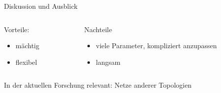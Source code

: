 \documentclass[10pt, compress, xetex]{beamer}
\begin{document}
\begin{frame}{Diskussion und Ausblick}
\begin{columns}[T]
  \begin{column}[T]{.5\textwidth}
        Vorteile:
        \begin{itemize}
          \item mächtig
          \item flexibel
        \end{itemize}
  \end{column}  
  \begin{column}[T]{.5\textwidth}
        Nachteile
        \begin{itemize}
          \item viele Parameter, kompliziert anzupassen
          \item langsam
        \end{itemize}
    \end{column}
\end{columns} 
In der \alert{aktuellen} Forschung relevant: Netze anderer Topologien 
\end{frame}
\end{document}
